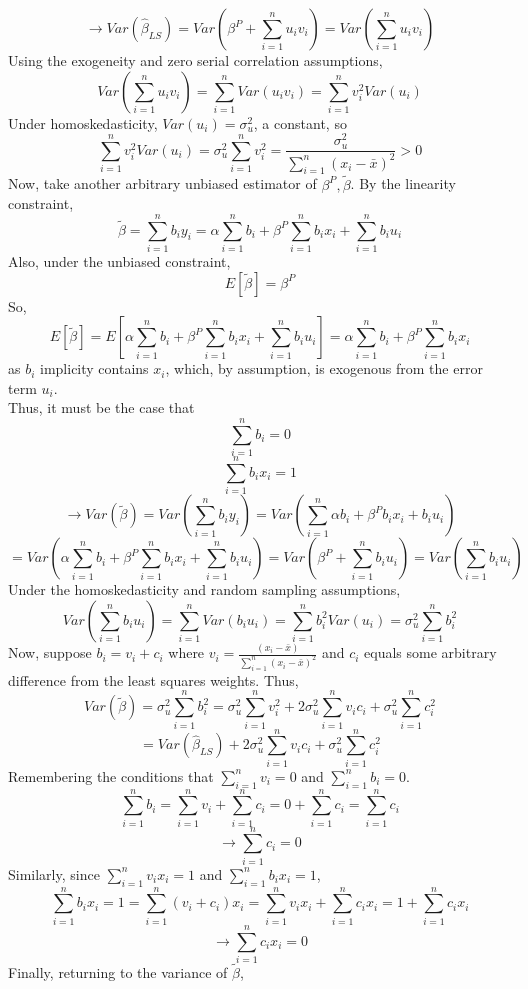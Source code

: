 \documentclass[11pt,letterhead]{article}
\begin{document}
$$\to Var(\hat{\beta}_{LS})=Var(\beta^P + \sum_{i=1}^n u_i v_i)=Var(\sum_{i=1}^n u_i v_i)$$
Using the exogeneity and zero serial correlation assumptions,
$$Var(\sum_{i=1}^n u_i v_i)=\sum_{i=1}^n Var(u_i v_i)=\sum_{i=1}^n v_i^2 Var(u_i)$$
Under homoskedasticity, $Var(u_i)=\sigma_u^2$, a constant, so
$$\sum_{i=1}^n v_i^2 Var(u_i)=\sigma_u^2\sum_{i=1}^n v_i^2=\frac{\sigma_u^2}{\sum_{i=1}^n (x_i-\bar{x})^2}>0$$
Now, take another arbitrary unbiased estimator of $\beta^P, \tilde{\beta}$.
By the linearity constraint, $$\tilde{\beta}=\sum_{i=1}^n b_i y_i=\alpha \sum_{i=1}^n b_i + \beta^P \sum_{i=1}^n b_i x_i + \sum_{i=1}^n b_i u_i$$
Also, under the unbiased constraint, $$E[\tilde{\beta}]=\beta^P$$
So, $$E[\tilde{\beta}]=E[\alpha \sum_{i=1}^n b_i + \beta^P \sum_{i=1}^n b_i x_i + \sum_{i=1}^n b_i u_i]=\alpha \sum_{i=1}^n b_i + \beta^P \sum_{i=1}^n b_i x_i$$
as $b_i$ implicity contains $x_i$, which, by assumption, is exogenous from the error term $u_i$.\\
Thus, it must be the case that
\begin{equation}
\sum_{i=1}^n b_i=0
\end{equation}
\begin{equation}
\sum_{i=1}^n b_i x_i=1
\end{equation}
$$\to Var(\tilde{\beta})=Var(\sum_{i=1}^n b_i y_i)=Var(\sum_{i=1}^n \alpha b_i + \beta^P b_i x_i + b_i u_i)$$
$$=Var(\alpha \sum_{i=1}^n b_i + \beta^P \sum_{i=1}^n b_i x_i + \sum_{i=1}^n b_i u_i)=Var(\beta^P + \sum_{i=1}^n b_i u_i)=Var(\sum_{i=1}^n b_i u_i)$$
Under the homoskedasticity and random sampling assumptions, $$Var(\sum_{i=1}^n b_i u_i)=\sum_{i=1}^n Var(b_i u_i)=\sum_{i=1}^n b_i^2 Var(u_i)=\sigma_u^2 \sum_{i=1}^n b_i^2$$
\newpage
Now, suppose $b_i=v_i + c_i$ where $v_i=\frac{(x_i-\bar{x})}{\sum_{i=1}^n (x_i-\bar{x})^2}$ and $c_i$ equals some arbitrary difference from the least squares weights.
Thus, $$Var(\tilde{\beta})=\sigma_u^2 \sum_{i=1}^n b_i^2=\sigma_u^2\sum_{i=1}^n v_i^2 + 2\sigma_u^2\sum_{i=1}^n v_i c_i + \sigma_u^2\sum_{i=1}^n c_i^2$$
$$=Var(\hat{\beta}_{LS})+2\sigma_u^2\sum_{i=1}^n v_i c_i + \sigma_u^2\sum_{i=1}^n c_i^2$$
Remembering the conditions that $\sum_{i=1}^n v_i=0$ and $\sum_{i=1}^n b_i=0$.
$$\sum_{i=1}^n b_i=\sum_{i=1}^n v_i + \sum_{i=1}^n c_i=0 + \sum_{i=1}^n c_i=\sum_{i=1}^n c_i$$
$$\to \sum_{i=1}^n c_i=0$$
Similarly, since $\sum_{i=1}^n v_i x_i=1$ and $\sum_{i=1}^n b_i x_i=1$,
$$\sum_{i=1}^n b_i x_i=1=\sum_{i=1}^n (v_i+c_i)x_i=\sum_{i=1}^n v_i x_i+\sum_{i=1}^n c_i x_i=1+\sum_{i=1}^n c_i x_i$$
$$\to \sum_{i=1}^n c_i x_i=0$$
Finally, returning to the variance of $\tilde{\beta}$,
\end{document}
